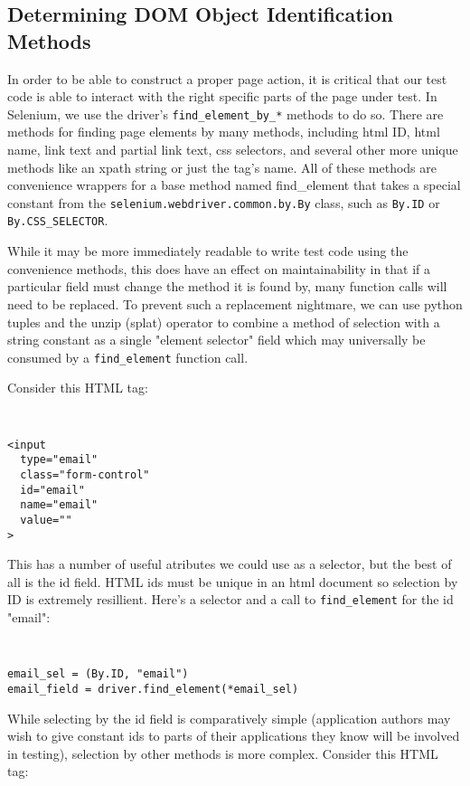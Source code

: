 \subsection{Determining DOM Object Identification Methods}
In order to be able to construct a proper page action, it is critical that our test code is able to interact with the right specific parts of the page under test. In Selenium, we use the driver's \texttt{find\_element\_by\_*} methods to do so. There are methods for finding page elements by many methods, including html ID, html name, link text and partial link text, css selectors, and several other more unique methods like an xpath string or just the tag's name. All of these methods are convenience wrappers for a base method named find\_element that takes a special constant from the \texttt{selenium.webdriver.common.by.By} class, such as \texttt{By.ID} or \texttt{By.CSS\_SELECTOR}.

While it may be more immediately readable to write test code using the convenience methods, this does have an effect on maintainability in that if a particular field must change the method it is found by, many function calls will need to be replaced.\citep{gupta2003dom} To prevent such a replacement nightmare, we can use python tuples and the unzip (splat) operator to combine a method of selection with a string constant as a single "element selector" field which may universally be consumed by a \texttt{find\_element} function call.

Consider this HTML tag:

{\tt
\begin{verbatim}
<input
  type="email"
  class="form-control"
  id="email"
  name="email"
  value=""
>
\end{verbatim}
}

This has a number of useful atributes we could use as a selector, but the best of all is the id field. HTML ids must be unique in an html document \citep{HTMLStan99} so selection by ID is extremely resillient. Here's a selector and a call to \texttt{find\_element} for the id "email":

{\tt
\begin{verbatim}
email_sel = (By.ID, "email")
email_field = driver.find_element(*email_sel)
\end{verbatim}
}

While selecting by the id field is comparatively simple (application authors may wish to give constant ids to parts of their applications they know will be involved in testing)\citep{DOMStand78}, selection by other methods is more complex. Consider this HTML tag:

